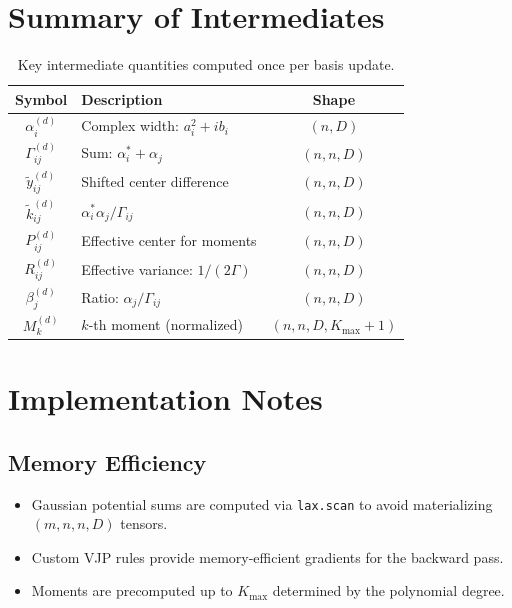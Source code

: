 \documentclass[11pt,a4paper]{article}
\theoremstyle{definition}
\begin{document}
\section{Summary of Intermediates}

\begin{table}[h]
\centering
\begin{tabular}{|c|l|c|}
\hline
\textbf{Symbol} & \textbf{Description} & \textbf{Shape} \\
\hline
$\alpha_i^{(d)}$ & Complex width: $a_i^2 + i b_i$ & $(n, D)$ \\
$\Gamma_{ij}^{(d)}$ & Sum: $\alpha_i^* + \alpha_j$ & $(n, n, D)$ \\
$\tilde{y}_{ij}^{(d)}$ & Shifted center difference & $(n, n, D)$ \\
$\tilde{k}_{ij}^{(d)}$ & $\alpha_i^* \alpha_j / \Gamma_{ij}$ & $(n, n, D)$ \\
$P_{ij}^{(d)}$ & Effective center for moments & $(n, n, D)$ \\
$R_{ij}^{(d)}$ & Effective variance: $1/(2\Gamma)$ & $(n, n, D)$ \\
$\beta_j^{(d)}$ & Ratio: $\alpha_j / \Gamma_{ij}$ & $(n, n, D)$ \\
$M_k^{(d)}$ & $k$-th moment (normalized) & $(n, n, D, K_{\max}+1)$ \\
\hline
\end{tabular}
\caption{Key intermediate quantities computed once per basis update.}
\end{table}

\section{Implementation Notes}

\subsection{Memory Efficiency}

\begin{itemize}
    \item Gaussian potential sums are computed via \texttt{lax.scan} to avoid materializing $(m, n, n, D)$ tensors.
    \item Custom VJP rules provide memory-efficient gradients for the backward pass.
    \item Moments are precomputed up to $K_{\max}$ determined by the polynomial degree.
\end{itemize}
\end{document}
